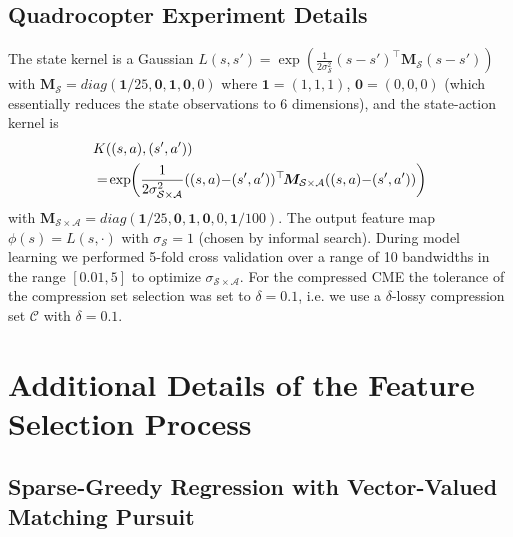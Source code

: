 \documentclass[letterpaper]{article}
\newcommand{\cC}{{\mathcal C}}
\newcommand{\cA}{{\mathcal A}}
\newcommand{\cS}{{\mathcal S}}
\newcommand{\bM}{{\bm M}}
\newcommand{\nn}{\nonumber}
\newcommand{\bzero}{{\bm 0}}
\newcommand{\bone}{{\bm 1}}
\begin{document}
\subsection{Quadrocopter Experiment Details}

The state kernel is a Gaussian $L(s,s') = \exp\left({\frac{1}{2\sigma_{\cS}^2}(s - s')^\top \bM_\cS (s - s')}\right)$ with $\bM_\cS =diag( \bone/25, \bzero ,\bone, \bzero ,0)$ where $\bone = (1,1,1)$, $\bzero = (0,0,0)$ (which essentially reduces the state observations to 6 dimensions), and the state-action kernel is
\begin{align}
&K((s,a),(s',a')) \nn\\
&= \hspace{-0.5mm}\exp\hspace{-0.8mm}\left({\frac{1}{2\sigma_{\cS\times\cA}^2}((s,a)\hspace{-0.8mm} - \hspace{-0.8mm}(s',a'))^\top \hspace{-0.5mm}\bM_{\cS\times\cA} ((s,a)\hspace{-0.8mm} -\hspace{-0.8mm} (s',a'))}\right)\nn
\end{align}
with $\bM_{\cS\times\cA} =diag(\bone /25,\bzero ,\bone,\bzero,0,  \bone/100)$. The output feature map $\phi(s) = L(s,\cdot)$ with $\sigma_{\cS} = 1$ (chosen by informal search). During model learning we performed 5-fold cross validation over a range of 10 bandwidths in the range $[0.01,5]$ to optimize $\sigma_{\cS\times\cA}$. For the compressed CME the tolerance of the compression set selection was set to $\delta = 0.1$, i.e. we use a $\delta$-lossy compression set $\cC$ with $\delta=0.1$.



\fontsize{9.5pt}{10.5pt} \selectfont


%
\fontsize{10pt}{12pt} \selectfont

\clearpage



\section{Additional Details of the Feature Selection Process}\label{MatchingPursuit}

\subsection{Sparse-Greedy Regression with Vector-Valued Matching Pursuit}
\end{document}
